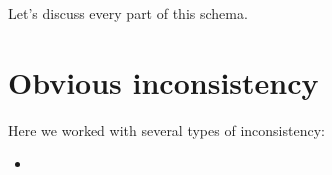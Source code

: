 Let's discuss every part of this schema.\\

\section*{Obvious inconsistency}

Here we worked with several types of inconsistency:

\begin{itemize}
    \item 
\end{itemize}

